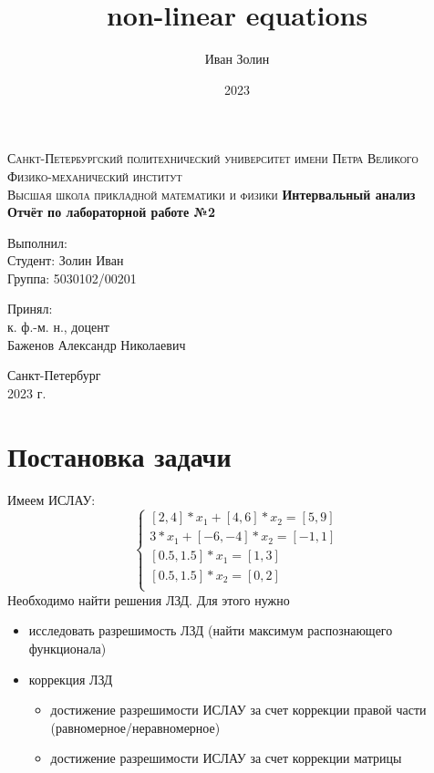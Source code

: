 \documentclass[a4paper,14pt]{article}
\title{non-linear equations}
\author{Иван Золин}
\date{2023}
\begin{document}
	
	\begin{titlepage}
		\begin{center}
			\textsc{
				Санкт-Петербургский политехнический университет имени Петра Великого \\[5mm]
				Физико-механический институт\\[2mm]
				Высшая школа прикладной математики и физики            
			}   
			\vfill
			\textbf{\large
				Интервальный анализ\\
				Отчёт по лабораторной работе №2 \\[3mm]
			}                
		\end{center}
		
		\vfill
		\hfill
		\begin{minipage}{0.5\textwidth}
			Выполнил: \\[2mm]   
			Студент: Золин Иван \\
			Группа: 5030102/00201\\
		\end{minipage}
		
		\hfill
		\begin{minipage}{0.5\textwidth}
			Принял: \\[2mm]
			к. ф.-м. н., доцент \\   
			Баженов Александр Николаевич
		\end{minipage}
		
		\vfill
		\begin{center}
			Санкт-Петербург \\2023 г.
		\end{center}
	\end{titlepage}
	
	\tableofcontents
	\newpage
	
	\section{Постановка задачи}
	Имеем ИСЛАУ:
	\begin{equation*}
		\begin{cases}
			[2, 4]*x_1 + [4,6]*x_2 = [5, 9]\\
			3*x_1 + [-6, -4]*x_2 = [-1, 1]\\
			[0.5, 1.5]*x_1 = [1, 3]\\
			[0.5, 1.5]*x_2 = [0, 2]\\
		\end{cases}
	\end{equation*}
	Необходимо найти решения ЛЗД. Для этого нужно
	\begin{itemize}
		\item исследовать разрешимость ЛЗД (найти максимум распознающего функционала)
		\item коррекция ЛЗД
		\begin{itemize}
			\item достижение разрешимости ИСЛАУ за счет коррекции правой части (равномерное/неравномерное)
			\item достижение разрешимости ИСЛАУ за счет коррекции матрицы
		\end{itemize}
	\end{itemize}
\end{document}
